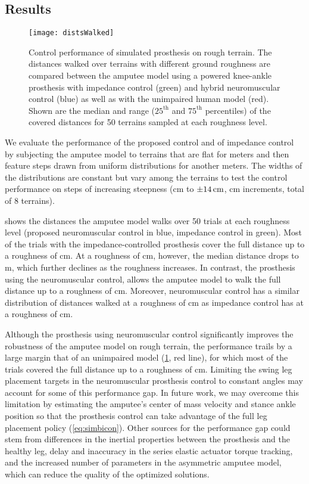 \subsection{Results}\label{sec:completed_comparison_results}
\begin{figure}[t]
    \centering
    \texttt{[image: distsWalked]}
    \caption{Control performance of simulated prosthesis on rough terrain. The
    distances walked over terrains with different ground roughness are compared
    between the amputee model using a powered knee-ankle prosthesis with
    impedance control (green) and hybrid neuromuscular control (blue) as well
    as with the unimpaired human model (red). Shown are the median and range
    ($25^\textrm{th}$ and $75^\textrm{th}$ percentiles) of the covered
    distances for 50 terrains sampled at each roughness level.
    }\label{fig:distsWalked}
\end{figure}

We evaluate the performance of the proposed control and of impedance control by
subjecting the amputee model to terrains that are flat for \unit[10]{meters} and
then feature steps drawn from uniform distributions for another
\unit[90]{meters}.  The widths of the distributions are constant but vary among
the terrains to test the control performance on steps of increasing steepness
(\unit[0]{cm} to $\pm \unit[14]{cm}$, \unit[2]{cm} increments, total of 8
terrains). 

 shows the distances the amputee model walks over 50
trials at each roughness level (proposed neuromuscular control in blue,
impedance control in green). Most of the trials with the impedance-controlled
prosthesis cover the full distance up to a roughness of \unit[2]{cm}. At a
roughness of \unit[4]{cm}, however, the median distance drops to \unit[34]{m},
which further declines as the roughness increases. In contrast, the  prosthesis
using the neuromuscular control, allows the amputee model to walk the full
distance up to a roughness of \unit[6]{cm}. Moreover, neuromuscular control has
a similar distribution of distances walked at a roughness of \unit[8]{cm} as
impedance control has at a roughness of \unit[4]{cm}.

Although the prosthesis using neuromuscular control significantly improves the
robustness of the amputee model on rough terrain, the performance trails by a
large margin that of an unimpaired model (\cref{fig:distsWalked}, red line), for
which most of the trials covered the full distance up to a roughness of
\unit[10]{cm}.  Limiting the swing leg placement targets in the neuromuscular
prosthesis control to constant angles may account for some of this performance
gap. In future work, we may overcome this limitation by estimating the amputee's
center of mass velocity and stance ankle position so that the prosthesis control
can take advantage of the full leg placement policy (\cref{eq:simbicon}). Other
sources for the performance gap could stem from differences in the inertial
properties between the prosthesis and the healthy leg, delay and inaccuracy in
the series elastic actuator torque tracking, and the increased number of
parameters in the asymmetric amputee model, which can reduce the quality of the
optimized solutions.

